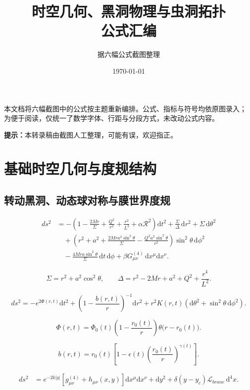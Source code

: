 \documentclass[UTF8,11pt,a4paper]{ctexart}
\title{\bfseries 时空几何、黑洞物理与虫洞拓扑\\[0.35em]
\large 公式汇编}
\author{据六幅公式截图整理}
\date{\today}
\newcommand{\R}{\mathcal{R}}
\newcommand{\Lag}{\mathcal{L}}
\newcommand{\dd}{\mathrm{d}}
\begin{document}
\maketitle
\thispagestyle{empty}

\begin{center}
\parbox{0.88\linewidth}{\small
本文档将六幅截图中的公式按主题重新编排。公式、指标与符号均依原图录入；
为便于阅读，仅统一了数学字体、行距与分段方式，未改动公式内容。

\smallskip
\noindent\textcolor{deepred}{\bfseries 提示：}本转录稿由截图人工整理，可能有误，欢迎指正。
}
\end{center}

\vspace{0.5em}

\section{基础时空几何与度规结构}

\subsection{转动黑洞、动态球对称与膜世界度规}

\begin{align*}
ds^2
&=-\left(1-\frac{2Mr}{\Sigma}+\frac{Q^2}{r^2}+\frac{r^2}{L^2}+\alpha\R^2\right)\dd t^2
  +\frac{\Sigma}{\Delta}\,\dd r^2+\Sigma\,\dd\theta^2\\
&\quad+\left(r^2+a^2+\frac{2Mra^2\sin^2\theta}{\Sigma}
  -\frac{Q^2a^2\sin^2\theta}{r^2}\right)\sin^2\theta\,\dd\phi^2\\
&\quad-\frac{4Mra\sin^2\theta}{\Sigma}\,\dd t\,\dd\phi
  +\beta G^{(4)}_{\mu\nu}\,\dd x^\mu\dd x^\nu .
\end{align*}

\[
\Sigma=r^2+a^2\cos^2\theta,\qquad
\Delta=r^2-2Mr+a^2+Q^2+\frac{r^4}{L^2}.
\]

\[
ds^2=-e^{2\Phi(r,t)}\dd t^2
+\left(1-\frac{b(r,t)}{r}\right)^{-1}\dd r^2
+r^2K(r,t)\left(\dd\theta^2+\sin^2\theta\,\dd\phi^2\right).
\]

\[
\Phi(r,t)=\Phi_0(t)\left(1-\frac{r_0(t)}{r}\right)\theta\bigl(r-r_0(t)\bigr).
\]

\[
b(r,t)=r_0(t)\left[1-\epsilon(t)\left(\frac{r_0(t)}{r}\right)^{\gamma(t)}\right].
\]

\begin{align*}
ds^2
&=e^{-2k|y|}\left[g^{(4)}_{\mu\nu}+h_{\mu\nu}(x,y)\right]\dd x^\mu\dd x^\nu
  +\dd y^2+\delta(y-y_c)\Lag_{brane}\,\dd^4x .
\end{align*}
\end{document}
